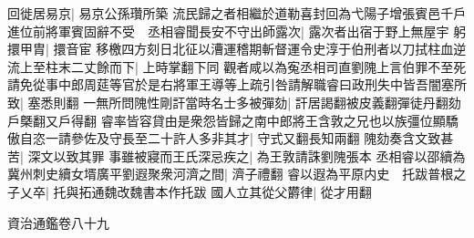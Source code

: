 回徙居易京|{
	易京公孫瓚所築}
流民歸之者相繼於道勒喜封回為弋陽子增張賓邑千戶進位前將軍賓固辭不受　丞相睿聞長安不守出師露次|{
	露次者出宿于野上無屋宇}
躬擐甲胄|{
	擐音宦}
移檄四方刻日北征以漕運稽期斬督運令史淳于伯刑者以刀拭柱血逆流上至柱末二丈餘而下|{
	上時掌翻下同}
觀者咸以為寃丞相司直劉隗上言伯罪不至死請免從事中郎周莚等官於是右將軍王導等上疏引咎請解職睿曰政刑失中皆吾闇塞所致|{
	塞悉則翻}
一無所問隗性剛訐當時名士多被彈劾|{
	訐居謁翻被皮義翻彈徒丹翻劾戶槩翻又戶得翻}
睿率皆容貸由是衆怨皆歸之南中郎將王含敦之兄也以族彊位顯驕傲自恣一請參佐及守長至二十許人多非其才|{
	守式又翻長知兩翻}
隗劾奏含文致甚苦|{
	深文以致其罪}
事雖被寢而王氏深忌疾之|{
	為王敦請誅劉隗張本}
丞相睿以邵續為冀州刺史續女壻廣平劉遐聚衆河濟之間|{
	濟子禮翻}
睿以遐為平原内史　托跋普根之子乂卒|{
	托與拓通魏改魏書本作托跋}
國人立其從父欝律|{
	從才用翻}


資治通鑑卷八十九
